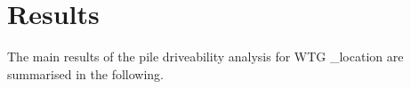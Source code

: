 








\chapter{Results}\label{sec_4}
The main results of the pile driveability analysis for WTG \ID_location are summarised in the following.







